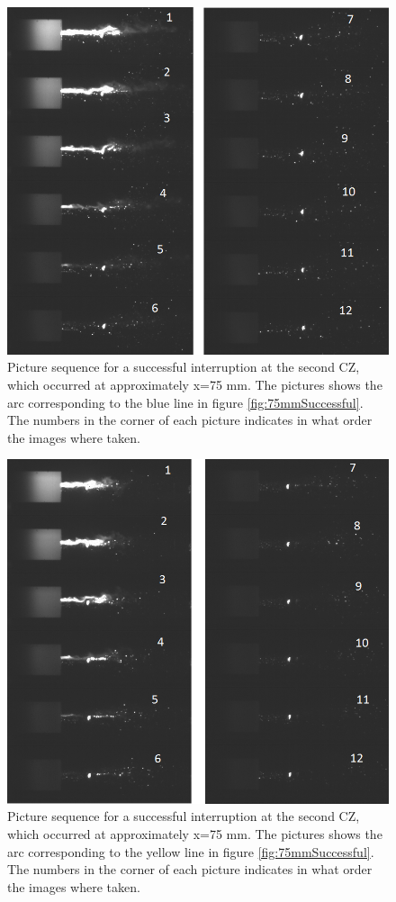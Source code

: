 \documentclass[10pt,b5paper,twoside]{article}
\begin{document}
\begin{figure}[H]
\centering
\includegraphics[scale=0.7, angle =0 ]{Bilder/Results/114_75_TR_OK.png}
\caption{Picture sequence for a successful interruption at the second CZ, which occurred at approximately x=75 mm. The pictures shows the arc corresponding to the blue line in figure \ref{fig:75mmSuccessful}. The numbers in the corner of each picture indicates in what order the images where taken.} \label{fig:arcingVoltage_test_114_blue_OK}
\end{figure}

\begin{figure}[H]
\centering
\includegraphics[scale=0.7, angle =0 ]{Bilder/Results/98_75_TR_OK.png}
\caption{Picture sequence for a successful interruption at the second CZ, which occurred at approximately x=75 mm. The pictures shows the arc corresponding to the yellow line in figure \ref{fig:75mmSuccessful}. The numbers in the corner of each picture indicates in what order the images where taken.} \label{fig:arcingVoltage_test_114_yellow_OK}
\end{figure}
\end{document}
